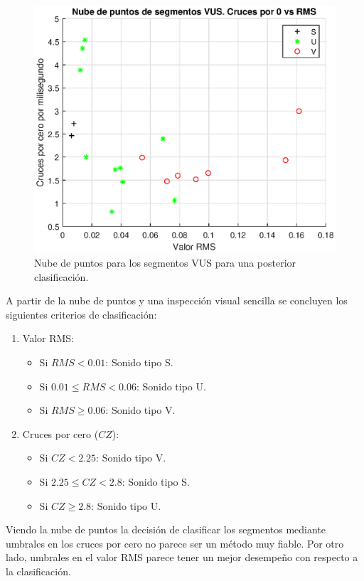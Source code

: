 \begin{figure}[H]
    \centering
    \includegraphics[width = .8\linewidth]{figures/p2_1nube.eps}
    \caption{Nube de puntos para los segmentos VUS para una posterior clasificación.}
    \label{fig:p2_1nube}
\end{figure}

A partir de la nube de puntos y una inspección visual sencilla se concluyen los siguientes criterios de clasificación:
\begin{enumerate}
    \item Valor RMS:
    \begin{itemize}
        \item Si $RMS < 0.01$: Sonido tipo S.
        \item Si $0.01 \leq RMS < 0.06$: Sonido tipo U.
        \item Si $RMS \geq 0.06$: Sonido tipo V.
    \end{itemize}
    
    \item Cruces por cero ($CZ$):
    \begin{itemize}
        \item Si $CZ < 2.25$: Sonido tipo V.
        \item Si $2.25 \leq CZ < 2.8$: Sonido tipo S.
        \item Si $CZ \geq 2.8$: Sonido tipo U.
    \end{itemize}
\end{enumerate}

Viendo la nube de puntos la decisión de clasificar los segmentos mediante umbrales en los cruces por cero no parece ser un método muy fiable. Por otro lado, umbrales en el valor RMS parece tener un mejor desempeño con respecto a la clasificación.

